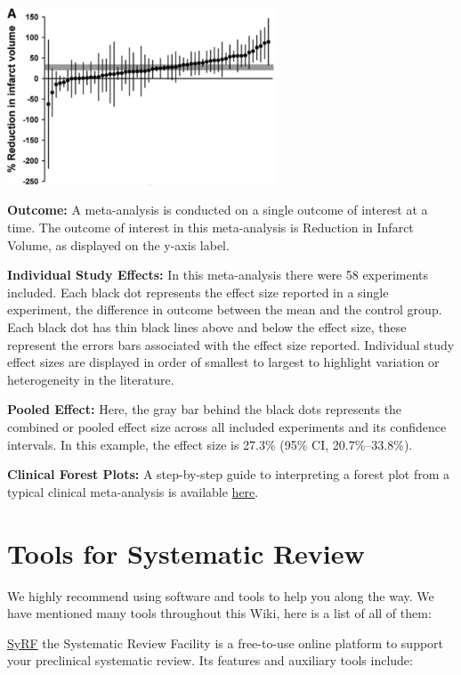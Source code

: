 \documentclass[
]{book}
\begin{document}
\includegraphics[width=0.6\textwidth,height=\textheight]{figs/timberplot.png}

\textbf{Outcome:}
A meta-analysis is conducted on a single outcome of interest at a time. The outcome of interest in this meta-analysis is Reduction in Infarct Volume, as displayed on the y-axis label.

\textbf{Individual Study Effects:}
In this meta-analysis there were 58 experiments included. Each black dot represents the effect size reported in a single experiment, the difference in outcome between the mean and the control group. Each black dot has thin black lines above and below the effect size, these represent the errors bars associated with the effect size reported. Individual study effect sizes are displayed in order of smallest to largest to highlight variation or heterogeneity in the literature.

\textbf{Pooled Effect:}
Here, the gray bar behind the black dots represents the combined or pooled effect size across all included experiments and its confidence intervals. In this example, the effect size is 27.3\% (95\% CI, 20.7\%--33.8\%).

\textbf{Clinical Forest Plots:} A step-by-step guide to interpreting a forest plot from a typical clinical meta-analysis is available \href{https://s4be.cochrane.org/blog/2016/07/11/tutorial-read-forest-plot/}{here}.

\hypertarget{tools-for-systematic-review}{%
\chapter{Tools for Systematic Review}\label{tools-for-systematic-review}}

We highly recommend using software and tools to help you along the way. We have mentioned many tools throughout this Wiki, here is a list of all of them:

\href{https://syrf.org.uk/}{SyRF} the Systematic Review Facility is a free-to-use online platform to support your preclinical systematic review. Its features and auxiliary tools include:
\end{document}
